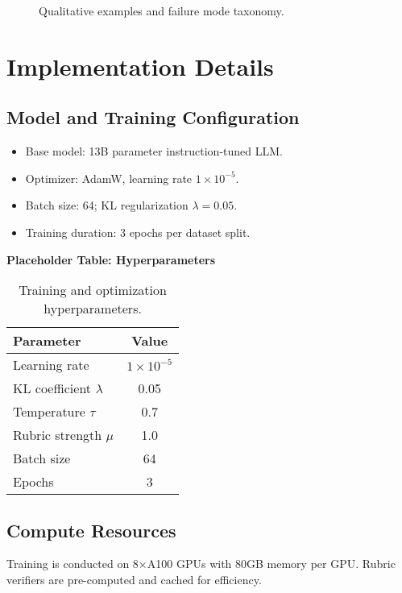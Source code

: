 \documentclass[sigconf]{acmart}
\begin{document}
\begin{figure}[h]
\centering
{}
\caption{Qualitative examples and failure mode taxonomy.}
\label{fig:qualitative-errors}
\end{figure}


\section{Implementation Details}
\label{appendix:implementation}

\subsection{Model and Training Configuration}
\begin{itemize}
    \item Base model: 13B parameter instruction-tuned LLM.
    \item Optimizer: AdamW, learning rate $1\times10^{-5}$.
    \item Batch size: 64; KL regularization $\lambda=0.05$.
    \item Training duration: 3 epochs per dataset split.
\end{itemize}

\textbf{Placeholder Table: Hyperparameters}
\begin{table}[h]
\centering
\caption{Training and optimization hyperparameters.}
\begin{tabular}{lc}
\toprule
Parameter & Value \\
\midrule
Learning rate & $1\times10^{-5}$ \\
KL coefficient $\lambda$ & 0.05 \\
Temperature $\tau$ & 0.7 \\
Rubric strength $\mu$ & 1.0 \\
Batch size & 64 \\
Epochs & 3 \\
\bottomrule
\end{tabular}
\label{tab:hyperparams}
\end{table}

\subsection{Compute Resources}
Training is conducted on 8$\times$A100 GPUs with 80GB memory per GPU.
Rubric verifiers are pre-computed and cached for efficiency.
\end{document}
